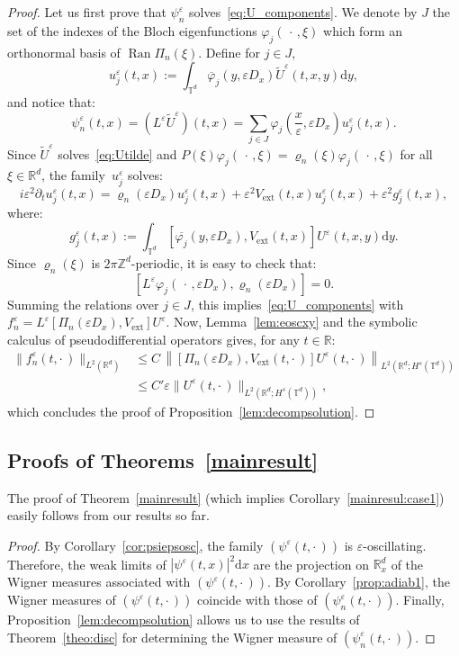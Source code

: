\documentclass[10pt]{amsart}
\theoremstyle{definition}
\DeclareMathOperator{\ext}{ext}
\DeclareMathOperator{\Ran}{Ran}
\newcommand*\R{{\mathbb R}}
\newcommand*\Z{{\mathbb Z}}
\newcommand*\T{{\mathbb T}}
\newcommand*\eps{\varepsilon}
\numberwithin{equation}{section}
\newcommand*{\dd}{\mathrm{d}}
\newcommand*{\dx}{\dd x}
\newcommand*{\dy}{\dd y}
\begin{document}
\begin{proof}
Let us first prove that $\psi_n^\eps$ solves~\eqref{eq:U_components}. We denote by $J$ the set of the indexes of the Bloch eigenfunctions $\varphi_j(\,\cdot\,,\xi)$ which form an orthonormal basis of $\Ran\Pi_n(\xi)$.
Define for $j\in J$,
\[
u^\eps_j(t,x):=\int_{\T^d} \overline \varphi_j(y,\eps D_x) \widetilde U^\eps(t,x,y) \dy,
\]
and notice that:
\[
\psi^\eps_n(t,x)=(L^\eps \widetilde U^\eps)(t,x)=\sum_{j\in J} \varphi_j\left(\frac{x}{\eps},\eps D_x\right) u^\eps_j(t,x).
\]
Since $\widetilde U^\eps$ solves~\eqref{eq:Utilde} and $P(\xi) \varphi_j(\,\cdot\,,\xi) = \varrho_n(\xi) \varphi_j(\,\cdot\,,\xi)$ for all $\xi\in\R^d$, the family~$u^\eps_j$ solves:
\[
i\eps^2\partial_t u^\eps_j (t,x)= \varrho_n(\eps D_x) u^\eps_j(t,x)+ \eps ^2 V_{\ext}(t,x) u^\eps_j(t,x)+\eps^2 g_j^\eps(t,x),
\]
where:
\[
g^\eps_j(t,x):=\int_{\T^d}[\overline{\varphi_j}(y,\eps D_x),V_{\ext}(t,x)]U^\eps (t,x,y)\dy.
\]
Since $\varrho_n(\xi)$ is $2\pi\Z^d$-periodic, it is easy to check that:
\[
[L^\eps\varphi_j(\,\cdot\,,\eps D_x),\varrho_n(\eps D_x)]=0.
\]
Summing the relations over $j\in J$, this implies~\eqref{eq:U_components} with $ f^\eps_n = L^\eps [\Pi_n(\eps D_x), V_{\ext}] U^\eps. $ Now, Lemma~\ref{lem:eoscxy} and the symbolic calculus of pseudodifferential operators gives, for any $t\in\R$:
\begin{align*}
\| f^\eps_n(t,\cdot\,)\|_{L^2(\R^d)}
&\leq C\, \left\| [\Pi_n(\eps D_x), V_{\ext} (t,\cdot\,)] U^\eps(t,\cdot\,)\right\|_{L^2(\R^d;H^s(\T^d))}\\
&\leq C'\eps \|U^\eps(t,\cdot\,)\|_{L^2(\R^d;H^s(\T^d))},
\end{align*}
which concludes the proof of Proposition~\ref{lem:decompsolution}.
\end{proof}



\subsection{Proofs of Theorems~\ref{mainresult}}


The proof of Theorem~\ref{mainresult} (which implies Corollary~\ref{mainresul:case1}) easily follows from our results so far.

\begin{proof}
By Corollary~\ref{cor:psiepsosc}, the family $(\psi^\eps(t,\cdot\,))$ is $\eps$-oscillating. Therefore, the weak limits of $|\psi^\eps(t,x)|^2\dx$ are the projection on $\R^d_x$ of the Wigner measures associated with $(\psi^\eps(t,\cdot\,))$. By Corollary~\ref{prop:adiab1}, the Wigner measures of $(\psi^\eps(t,\cdot\,))$ coincide with those of $(\psi^\eps_n(t,\cdot\,))$. Finally,
Proposition~\ref{lem:decompsolution} allows us to use the results of Theorem~\ref{theo:disc} for determining the Wigner measure of $(\psi^\eps_n(t,\cdot\,))$.
\end{proof}
\end{document}
